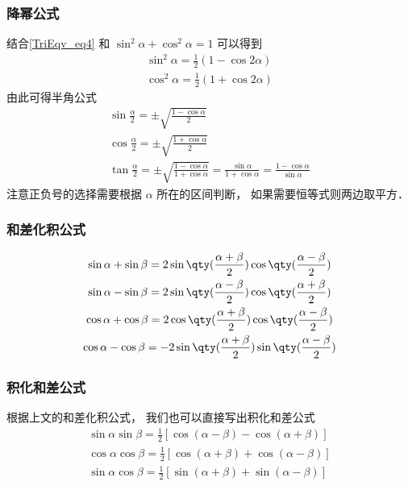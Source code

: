 \subsubsection{降幂公式}
结合\autoref{TriEqv_eq4} 和 $\sin^2 \alpha + \cos^2 \alpha = 1$ 可以得到
\begin{gather}
\sin^2 \alpha = \frac12 (1- \cos 2\alpha) \label{TriEqv_eq5} \\
\cos^2 \alpha = \frac12 (1+\cos 2\alpha) \label{TriEqv_eq6}
\end{gather}
由此可得半角公式
\begin{gather}
\sin\frac{ \alpha}{2} = \pm\sqrt{\frac{1-\cos \alpha}{2}}\\
\cos\frac{ \alpha}{2}= \pm\sqrt{\frac{1+\cos \alpha}{2}}\\
\tan\frac{ \alpha}{2} = \pm\sqrt{\frac{1-\cos \alpha}{1+\cos \alpha}} = \frac{\sin \alpha}{1+\cos \alpha} = \frac{1-\cos \alpha}{\sin \alpha}
\end{gather}
注意正负号的选择需要根据 $\alpha$ 所在的区间判断， 如果需要恒等式则两边取平方．

\subsubsection{和差化积公式}
\begin{gather}
\sin \alpha + \sin \beta = 2\sin\qty(\frac{\alpha + \beta}{2})\cos\qty(\frac{\alpha - \beta}{2})\label{TriEqv_eq7}\\
\sin \alpha - \sin \beta = 2\sin\qty(\frac{\alpha - \beta}{2})\cos\qty(\frac{\alpha + \beta}{2})\label{TriEqv_eq8}\\
\cos \alpha + \cos \beta = 2\cos\qty(\frac{\alpha+\beta}{2})\cos\qty(\frac{\alpha-\beta}{2})\label{TriEqv_eq9}\\
\cos \alpha - \cos \beta = -2\sin\qty(\frac{\alpha+\beta}{2})\sin\qty(\frac{\alpha-\beta}{2})\label{TriEqv_eq10}
\end{gather}

\subsubsection{积化和差公式}
根据上文的和差化积公式， 我们也可以直接写出积化和差公式
\begin{gather}
\label{TriEqv_eq11}
\sin \alpha\sin \beta = \frac12 [\cos(\alpha - \beta) - \cos(\alpha + \beta)]\\
\label{TriEqv_eq12}
\cos \alpha\cos \beta = \frac12 [\cos(\alpha + \beta) + \cos(\alpha - \beta)]\\
\label{TriEqv_eq14}
\sin \alpha\cos \beta = \frac12 [\sin(\alpha + \beta) + \sin(\alpha - \beta)]
\end{gather}


